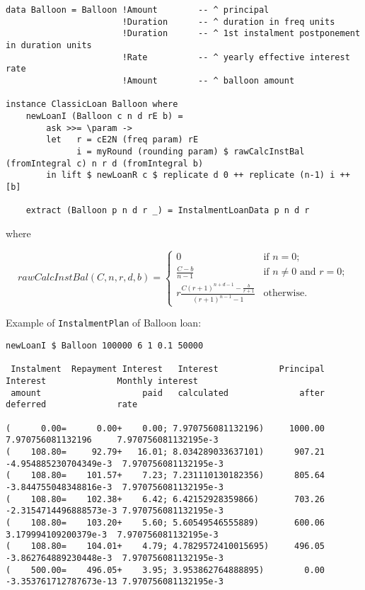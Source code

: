 \documentclass[letterpaper,11pt]{article}
\begin{document}
{\small
\begin{verbatim}
data Balloon = Balloon !Amount        -- ^ principal
                       !Duration      -- ^ duration in freq units
                       !Duration      -- ^ 1st instalment postponement in duration units
                       !Rate          -- ^ yearly effective interest rate
                       !Amount        -- ^ balloon amount

instance ClassicLoan Balloon where
    newLoanI (Balloon c n d rE b) =
        ask >>= \param ->
        let   r = cE2N (freq param) rE
              i = myRound (rounding param) $ rawCalcInstBal (fromIntegral c) n r d (fromIntegral b)
        in lift $ newLoanR c $ replicate d 0 ++ replicate (n-1) i ++ [b]

    extract (Balloon p n d r _) = InstalmentLoanData p n d r
\end{verbatim}
}

where

\begin{equation}
rawCalcInstBal (C, n, r, d, b) = \left\{ \begin{array}{ll}
                                    0 & \mbox{if $n=0$};\\
                                    \frac{C-b}{n-1}& \mbox{if $n \neq 0$ and $r=0$};\\
                                    r \frac{C(r+1)^{n+d-1}-\frac{b}{r+1}}{(r+1)^{n-1}- 1} & \mbox{otherwise}.
                                    \end{array} \right.
\end{equation}

Example of {\tt InstalmentPlan} of Balloon loan:
{\footnotesize
\begin{verbatim}
newLoanI $ Balloon 100000 6 1 0.1 50000

 Instalment  Repayment Interest   Interest            Principal  Interest              Monthly interest
 amount                    paid   calculated              after  deferred              rate

(      0.00=      0.00+    0.00; 7.970756081132196)     1000.00  7.970756081132196     7.970756081132195e-3
(    108.80=     92.79+   16.01; 8.034289033637101)      907.21 -4.954885230704349e-3  7.970756081132195e-3
(    108.80=    101.57+    7.23; 7.231110130182356)      805.64 -3.844755048348816e-3  7.970756081132195e-3
(    108.80=    102.38+    6.42; 6.42152928359866)       703.26 -2.3154714496888573e-3 7.970756081132195e-3
(    108.80=    103.20+    5.60; 5.60549546555889)       600.06  3.179994109200379e-3  7.970756081132195e-3
(    108.80=    104.01+    4.79; 4.7829572410015695)     496.05 -3.862764889230448e-3  7.970756081132195e-3
(    500.00=    496.05+    3.95; 3.953862764888895)        0.00 -3.353761712787673e-13 7.970756081132195e-3
\end{verbatim}
}
\end{document}
